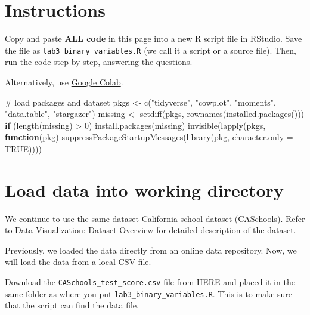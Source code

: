 \documentclass[
  12pt,
  a4paper,
]{scrbook}
\newenvironment{Shaded}{\begin{snugshade}}{\end{snugshade}}
\newcommand{\AttributeTok}[1]{\textcolor[rgb]{0.40,0.45,0.13}{#1}}
\newcommand{\CommentTok}[1]{\textcolor[rgb]{0.37,0.37,0.37}{#1}}
\newcommand{\ConstantTok}[1]{\textcolor[rgb]{0.56,0.35,0.01}{#1}}
\newcommand{\ControlFlowTok}[1]{\textcolor[rgb]{0.00,0.23,0.31}{\textbf{#1}}}
\newcommand{\DecValTok}[1]{\textcolor[rgb]{0.68,0.00,0.00}{#1}}
\newcommand{\FunctionTok}[1]{\textcolor[rgb]{0.28,0.35,0.67}{#1}}
\newcommand{\NormalTok}[1]{\textcolor[rgb]{0.00,0.23,0.31}{#1}}
\newcommand{\OtherTok}[1]{\textcolor[rgb]{0.00,0.23,0.31}{#1}}
\newcommand{\SpecialCharTok}[1]{\textcolor[rgb]{0.37,0.37,0.37}{#1}}
\newcommand{\StringTok}[1]{\textcolor[rgb]{0.13,0.47,0.30}{#1}}
\theoremstyle{plain}
\theoremstyle{definition}
\theoremstyle{remark}
\begin{document}
\section{Instructions}\label{instructions-1}

Copy and paste \textbf{ALL code} in this page into a new R script file
in RStudio. Save the file as \texttt{lab3\_binary\_variables.R} (we call
it a script or a source file). Then, run the code step by step,
answering the questions.

Alternatively, use
\href{https://colab.research.google.com/drive/1EcWkJfhHJOhDEHXaZgu3_f66pnlEum5R?usp=share_link}{Google
Colab}.

\begin{Shaded}
\begin{Highlighting}[]
\CommentTok{\# load packages and dataset}
\NormalTok{pkgs }\OtherTok{\textless{}{-}} \FunctionTok{c}\NormalTok{(}\StringTok{"tidyverse"}\NormalTok{, }\StringTok{"cowplot"}\NormalTok{, }\StringTok{"moments"}\NormalTok{, }\StringTok{"data.table"}\NormalTok{, }\StringTok{"stargazer"}\NormalTok{)}
\NormalTok{missing }\OtherTok{\textless{}{-}} \FunctionTok{setdiff}\NormalTok{(pkgs, }\FunctionTok{rownames}\NormalTok{(}\FunctionTok{installed.packages}\NormalTok{()))}
\ControlFlowTok{if}\NormalTok{ (}\FunctionTok{length}\NormalTok{(missing) }\SpecialCharTok{\textgreater{}} \DecValTok{0}\NormalTok{) }\FunctionTok{install.packages}\NormalTok{(missing)}
\FunctionTok{invisible}\NormalTok{(}\FunctionTok{lapply}\NormalTok{(pkgs, }\ControlFlowTok{function}\NormalTok{(pkg) }\FunctionTok{suppressPackageStartupMessages}\NormalTok{(}\FunctionTok{library}\NormalTok{(pkg, }\AttributeTok{character.only =} \ConstantTok{TRUE}\NormalTok{))))}
\end{Highlighting}
\end{Shaded}

\section{Load data into working
directory}\label{load-data-into-working-directory}

We continue to use the same dataset California school dataset
(CASchools). Refer to \hyperref[dataset-overview]{Data Visualization:
Dataset Overview} for detailed description of the dataset.

Previously, we loaded the data directly from an online data repository.
Now, we will load the data from a local CSV file.

Download the \texttt{CASchools\_test\_score.csv} file from
\href{https://raw.githubusercontent.com/my1396/FIN5005/refs/heads/main/data/CASchools_test_score.csv}{HERE}
and placed it in the same folder as where you put
\texttt{lab3\_binary\_variables.R}. This is to make sure that the script
can find the data file.
\end{document}
